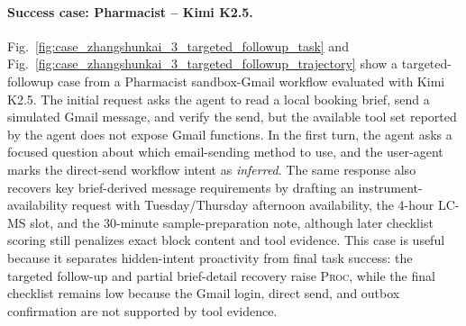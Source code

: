 \documentclass{llmxive}
\providecommand{\inferred}{\colorbox{cyan!20}{\textit{inferred}}}
\providecommand{\caseZhangshunkaiThreeTag}[3]{    {\setlength{\fboxsep}{1.6pt}\colorbox{#1}{\scriptsize\textbf{#3}}}}
\providecommand{\caseZhangshunkaiThreeLine}[3]{    \caseZhangshunkaiThreeTag{#1}{#2}{#3}\hspace{3pt}}
\providecommand{\caseZhangshunkaiThreeIO}[3]{    \vspace{2pt}
    \noindent\caseZhangshunkaiThreeLine{#1}{white}{#2}\textbf{#3}
}
\providecommand{\caseZhangshunkaiThreeNote}[1]{    \vspace{2pt}
    \noindent{\scriptsize\textit{#1}}
}
\providecommand{\caseZhangshunkaiThreeBox}[2]{\begin{tcolorbox}[
    title=#1,
    colback=casebg,
    colframe=casetitlebg,
    rounded corners,
    sharp corners=northeast,
    sharp corners=southwest,
    width=1.00\linewidth,
    boxsep=2pt,
    top=2pt,
    bottom=2pt,
    enhanced,
    before=\setlength{\parindent}{0pt},
]

#2
\end{tcolorbox}
}
\begin{document}
\paragraph{Success case: Pharmacist -- Kimi K2.5.}
Fig.~\ref{fig:case_zhangshunkai_3_targeted_followup_task} and Fig.~\ref{fig:case_zhangshunkai_3_targeted_followup_trajectory} show a targeted-followup case from a Pharmacist sandbox-Gmail workflow evaluated with Kimi K2.5.
The initial request asks the agent to read a local booking brief, send a simulated Gmail message, and verify the send, but the available tool set reported by the agent does not expose Gmail functions.
In the first turn, the agent asks a focused question about which email-sending method to use, and the user-agent marks the direct-send workflow intent as {\inferred}.
The same response also recovers key brief-derived message requirements by drafting an instrument-availability request with Tuesday/Thursday afternoon availability, the 4-hour LC-MS slot, and the 30-minute sample-preparation note, although later checklist scoring still penalizes exact block content and tool evidence.
This case is useful because it separates hidden-intent proactivity from final task success: the targeted follow-up and partial brief-detail recovery raise \textsc{Proc}, while the final checklist remains low because the Gmail login, direct send, and outbox confirmation are not supported by tool evidence.

\providecommand{\caseZhangshunkaiThreeTag}[3]{%
    {\setlength{\fboxsep}{1.6pt}\colorbox{#1}{\scriptsize\textbf{#3}}}%
}
\providecommand{\caseZhangshunkaiThreeLine}[3]{%
    \caseZhangshunkaiThreeTag{#1}{#2}{#3}\hspace{3pt}%
}
\providecommand{\caseZhangshunkaiThreeIO}[3]{%
    \vspace{2pt}
    \noindent\caseZhangshunkaiThreeLine{#1}{white}{#2}\textbf{#3}
}
\providecommand{\caseZhangshunkaiThreeNote}[1]{%
    \vspace{2pt}
    \noindent{\scriptsize\textit{#1}}
}
\providecommand{\caseZhangshunkaiThreeBox}[2]{%
\begin{tcolorbox}[
    title=#1,
    colback=casebg,
    colframe=casetitlebg,
    rounded corners,
    sharp corners=northeast,
    sharp corners=southwest,
    width=1.00\linewidth,
    boxsep=2pt,
    top=2pt,
    bottom=2pt,
    enhanced,
    before=,
]

#2
\end{tcolorbox}
}
\end{document}

